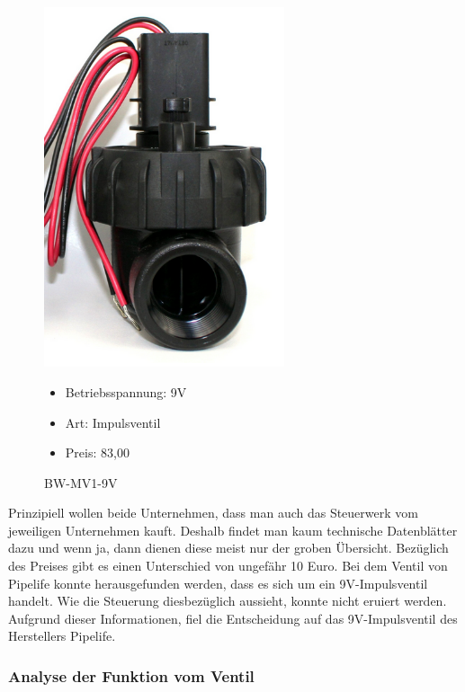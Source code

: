\begin{figure}[H]
\begin{minipage}[t]{0.45\textwidth}
\includegraphics[width=0.63\textwidth]{fig/VentilRainbird}
\caption{BW-MV1-9V}

\begin{itemize}
	\item{Betriebsspannung: 9V}
	\item{Art: Impulsventil}
	\item{Preis: 83,00\textsf{\texteuro} \cite{preisVentil}}
\end{itemize}

\end{minipage}
\end{figure} 

Prinzipiell wollen beide Unternehmen, dass man auch das Steuerwerk vom jeweiligen Unternehmen kauft. Deshalb findet man kaum technische Datenblätter dazu und wenn ja, dann dienen diese meist nur der groben Übersicht. Bezüglich des Preises gibt es einen Unterschied von ungefähr 10 Euro. Bei dem Ventil von Pipelife konnte herausgefunden werden, dass es sich um ein 9V-Impulsventil handelt. Wie die Steuerung diesbezüglich aussieht, konnte nicht eruiert werden. Aufgrund dieser Informationen, fiel die Entscheidung auf das 9V-Impulsventil des Herstellers Pipelife.

\subsubsection{Analyse der Funktion vom Ventil}
\label{sec:funktionstestungVentil}

